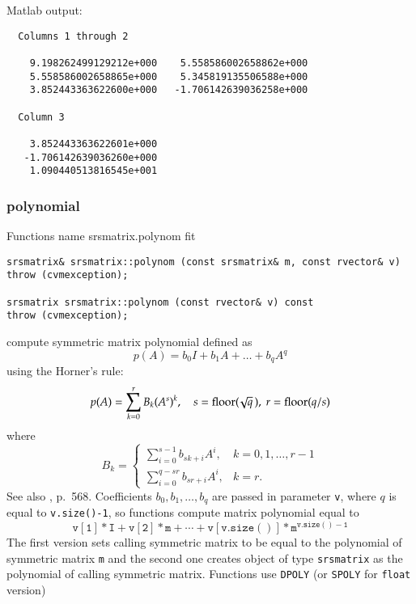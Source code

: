 Matlab output:
\begin{Verbatim}
  Columns 1 through 2 

    9.198262499129212e+000    5.558586002658862e+000
    5.558586002658865e+000    5.345819135506588e+000
    3.852443363622600e+000   -1.706142639036258e+000

  Column 3 

    3.852443363622601e+000
   -1.706142639036260e+000
    1.090440513816545e+001
\end{Verbatim}
\newpage



\subsubsection{polynomial}
Functions%
\pdfdest name {srsmatrix.polynom} fit
\begin{verbatim}
srsmatrix& srsmatrix::polynom (const srsmatrix& m, const rvector& v)
throw (cvmexception);

srsmatrix srsmatrix::polynom (const rvector& v) const
throw (cvmexception);
\end{verbatim}
compute  symmetric matrix polynomial defined as
\begin{equation*}
p(A)=b_0I+b_1A+\dots+b_qA^q
\end{equation*}
using the Horner's rule:
\begin{equation*}
p(A)=\sum_{k=0}^r B_k(A^s)^k,\quad s=\operatorname{floor}(\!\sqrt{q}\,),\ r=\operatorname{floor}(q/s)
\end{equation*}
where
\begin{equation*}
B_k=\begin{cases}
\sum\limits_{i=0}^{s-1}b_{sk+i} A^i, & k=0,1,\dots,r-1\\
\sum\limits_{i=0}^{q-sr}b_{sr+i} A^i, & k=r.
\end{cases}
\end{equation*}
See also , p.~568.
Coefficients $b_0,b_1,\dots,b_q$ are passed in  parameter 
\verb"v",
where $q$ is equal to \verb"v.size()-1", so  functions
compute matrix polynomial equal to
\begin{equation*}
\mathtt{v[1]*I + v[2]*m +\cdots + v[v.size()]*m^{v.size()-1}}
\end{equation*}
The first version sets  calling symmetric matrix to be equal 
to the polynomial of  symmetric matrix \verb"m"
and the second one
creates  object of type \verb"srsmatrix" as the 
polynomial of calling symmetric matrix.
Functions use \verb"DPOLY" (or \verb"SPOLY" for \verb"float" version)
